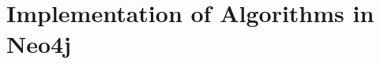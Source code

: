 \documentclass[11pt]{article}
\begin{document}
{{\begin{enumerate}
\end{enumerate}
%



\section{\textbf{Implementation of Algorithms in Neo4j}}
}}
\end{document}
